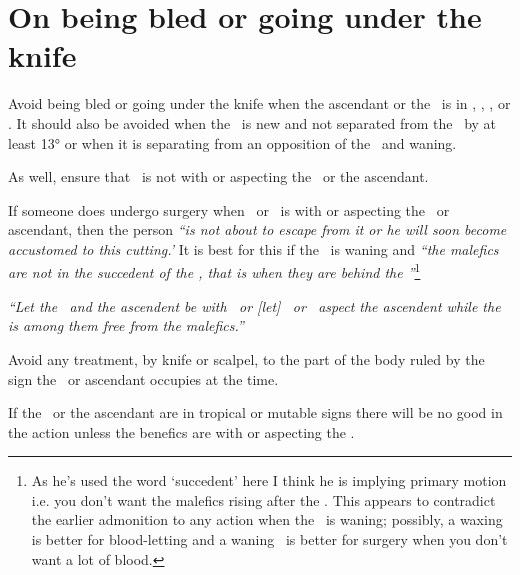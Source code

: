 \section{On being bled or going under the knife}
Avoid being bled or going under the knife when the ascendant or the \Moon\, is in \Taurus, \Virgo, \Capricorn, or \Pisces. It should also be avoided when the \Moon\, is new and not separated from the \Sun\, by at least 13° or when it is separating from an opposition of the \Sun\, and waning.

As well, ensure that \Mars\, is not with or aspecting the \Moon\, or the ascendant.

If someone does undergo surgery when \Mars\, or \Saturn\, is with or aspecting the \Moon\, or ascendant, then the person \textsl{``is not about to escape from it or he will soon become accustomed to this cutting.'} It is best for this if the \Moon\, is waning and \textsl{``the malefics are not in the succedent of the \Moon, that is when they are behind the \Moon''}\footnote{As he's used the word `succedent' here I think he is implying primary motion i.e. you don't want the malefics rising after the \Moon. This appears to contradict the earlier admonition to any action when the \Moon\, is waning; possibly, a waxing \Moon\, is better for blood-letting and a waning \Moon\, is better for surgery when you don't want a lot of blood.}

\textsl{``Let the \Moon\, and the ascendent be with \Venus\, or [let] \Jupiter\, or \Venus\, aspect the ascendent while the \Moon\, is among them free from the malefics.''}

Avoid any treatment, by knife or scalpel, to the part of the body ruled by the sign the \Moon\, or ascendant occupies at the time.

If the \Moon\, or the ascendant are in tropical or mutable signs there will be no good in the action unless the benefics are with or aspecting the \Moon.

